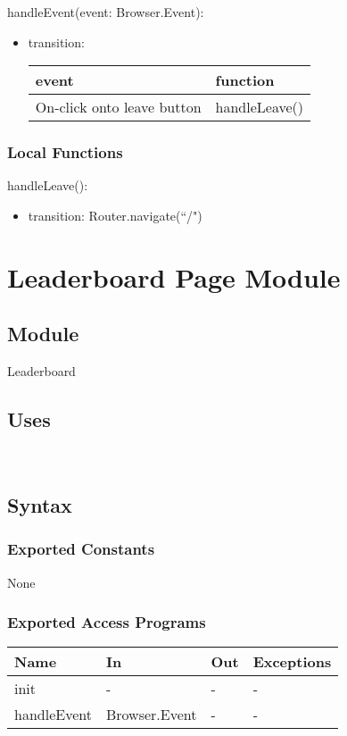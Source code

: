 \documentclass[12pt, titlepage]{article}
\begin{document}
\noindent handleEvent(event: Browser.Event):
\begin{itemize}
\item transition: \begin{tabular}{p{5cm} p{4cm}}
\hline
\textbf{event} & \textbf{function} \\
\hline
On-click onto leave button & handleLeave() \\
\hline
\end{tabular}
    
\end{itemize}

\subsubsection{Local Functions}

\noindent handleLeave():
\begin{itemize}
\item transition: Router.navigate(``/")
\end{itemize}


\newpage

\section{Leaderboard Page Module} \label{Leaderboard}
\subsection{Module}
Leaderboard
\subsection{Uses}
\\

\subsection{Syntax}

\subsubsection{Exported Constants}
None
\subsubsection{Exported Access Programs}
\begin{center}
\begin{tabular}{p{2cm} p{4cm} p{4cm} p{2cm}}
\hline
\textbf{Name} & \textbf{In} & \textbf{Out} & \textbf{Exceptions} \\
\hline
init & - & - & - \\
handleEvent & Browser.Event & - & -\\
\hline
\end{tabular}
\end{center}
\end{document}
